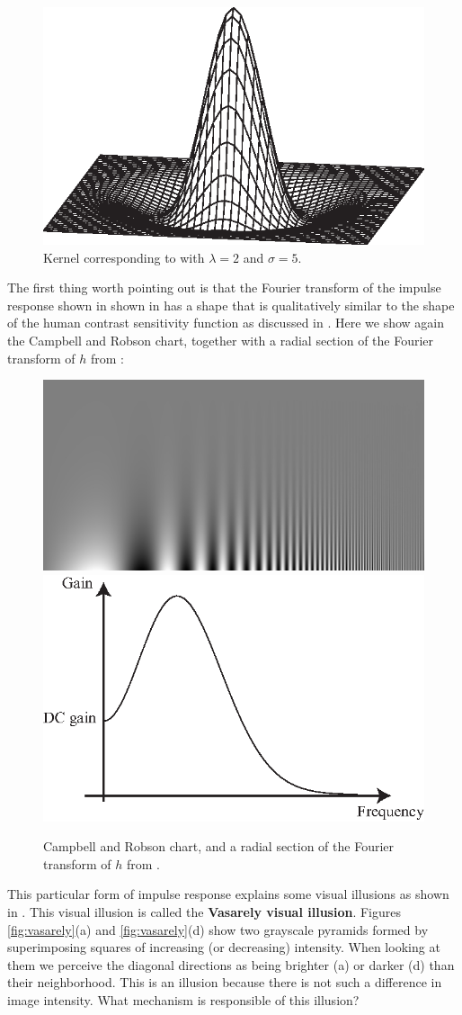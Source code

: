 \begin{figure}[h]
	\centerline{
		\includegraphics[width=.4\linewidth]{figures/derivatives/EVS_sigma5_lambda2.eps}}
	\caption{Kernel corresponding to \eqn{\ref{eq:humanmodel}} with $\lambda = 2$ and $\sigma=5$.}
	\label{fig:EVS_sigma5_lambda2}
\end{figure}
The first thing worth pointing out is that the Fourier transform of the impulse response shown in shown in \fig{\ref{fig:EVS_sigma5_lambda2}} has a shape that is qualitatively similar to the shape of the human contrast sensitivity function as discussed in \chap{\ref{chapter:fourier_analysis}}. Here we show again the Campbell and Robson chart, together with a radial section of the Fourier transform of $h$ from \eqn{\ref{eq:humanmodel}}:

\begin{figure}[h]
	\centerline{
		\includegraphics[trim=0cm 0cm 2cm 0cm, clip=true,width=.45\linewidth]{figures/spatial_filters/csf.jpg}
		\includegraphics[width=.45\linewidth]{figures/derivatives/dft_radial_EVS.eps}
	}
	\caption{Campbell and Robson chart, and a radial section of the Fourier transform of $h$ from .}
\end{figure}

This particular form of impulse response explains some visual illusions as shown in \fig{\ref{fig:vasarely}}. This visual illusion is called the {\bf Vasarely visual illusion}.
Figures \ref{fig:vasarely}(a) and \ref{fig:vasarely}(d) show two grayscale pyramids  formed by superimposing squares of increasing (or decreasing) intensity. When looking at them we perceive the diagonal directions as being brighter (a) or darker (d) than their neighborhood. This is an illusion because there is not such a difference in image intensity. What mechanism is responsible of this illusion?

